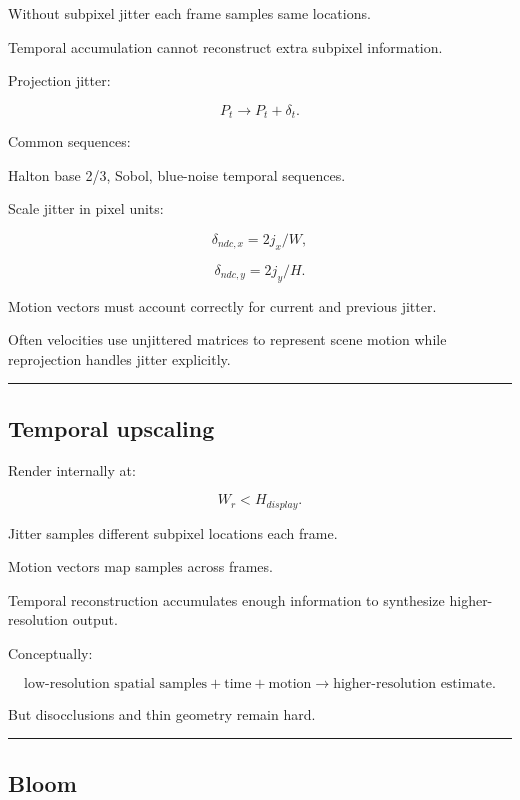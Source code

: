 \hypertarget{04-visual-computing-ii-ch040-jitter}{}

Without subpixel jitter each frame samples same locations.

Temporal accumulation cannot reconstruct extra subpixel information.

Projection jitter:

\[
P_t
\rightarrow
P_t+\delta_t.
\]

Common sequences:

Halton base 2/3, Sobol, blue-noise temporal sequences.

Scale jitter in pixel units:

\[
\delta_{ndc,x}
=
2j_x/W,
\]

\[
\delta_{ndc,y}
=
2j_y/H.
\]

Motion vectors must account correctly for current and previous jitter.

Often velocities use unjittered matrices to represent scene motion while reprojection handles jitter explicitly.

\begin{center}\rule{0.5\linewidth}{0.5pt}\end{center}

\subsection{Temporal upscaling}\label{04-visual-computing-ii-ch040-temporal-upscaling}

\hypertarget{04-visual-computing-ii-ch040-temporal-upscaling}{}

Render internally at:

\[
W_r<H_{display}.
\]

Jitter samples different subpixel locations each frame.

Motion vectors map samples across frames.

Temporal reconstruction accumulates enough information to synthesize higher-resolution output.

Conceptually:

\[
\boxed{
\text{low-resolution spatial samples}
+
\text{time}
+
\text{motion}
\rightarrow
\text{higher-resolution estimate}.
}
\]

But disocclusions and thin geometry remain hard.

\begin{center}\rule{0.5\linewidth}{0.5pt}\end{center}

\subsection{Bloom}\label{04-visual-computing-ii-ch040-bloom}

